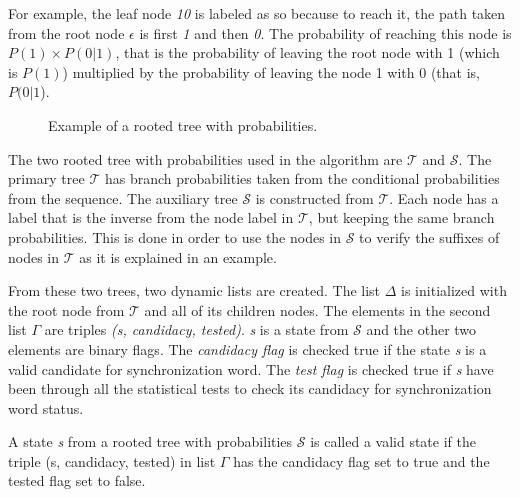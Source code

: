 {For example, the leaf node \textit{10} is labeled as so because to reach it, the path taken from the root node $\epsilon$ is first \textit{1} and then \textit{0}. The probability of reaching this node is $P(1)\times P(0|1)$, that is the probability of leaving the root node with 1 (which is $P(1)$) multiplied by the probability of leaving the node 1 with 0 (that is, $P(0|1$). 

\begin{figure}[h]
\centering
{}
\caption{Example of a rooted tree with probabilities. \label{fig:rtp}}
\end{figure}

 The two rooted tree with probabilities used in the algorithm are $\mathcal{T}$ and $\mathcal{S}$. The primary tree $\mathcal{T}$ has branch probabilities taken from the conditional probabilities from the sequence. The auxiliary tree $\mathcal{S}$ is constructed from $\mathcal{T}$. Each node has a label that is the inverse from the node label in $\mathcal{T}$, but keeping the same branch probabilities. This is done in order to use the nodes in $\mathcal{S}$ to verify the suffixes of nodes in $\mathcal{T}$ as it is explained in an example. 

From these two trees, two dynamic lists are created. The list $\Delta$ is initialized with the root node from $\mathcal{T}$ and all of its children nodes. The elements in the second list $\Gamma$ are triples \textit{(s, candidacy, tested)}. \textit{s} is a state from $\mathcal{S}$ and the other two elements are binary flags. The \textit{candidacy flag} is checked true if the state \textit{s} is a valid candidate for synchronization word. The \textit{test flag} is checked true if \textit{s} have been through all the statistical tests to check its candidacy for synchronization word status.

\begin{definition}\label{definition:validstate}
A state \textit{s} from a rooted tree with probabilities $\mathcal{S}$ is called a valid state if the triple (s, candidacy, tested) in list $\Gamma$ has the candidacy flag set to true and the tested flag set to false. 
\end{definition}

}
